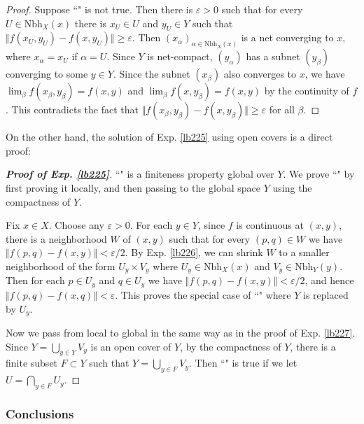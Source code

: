 \documentclass[12pt,b5paper,notitlepage]{article}
\theoremstyle{definition}
\theoremstyle{plain}
\newcommand{\Nbh}{\mathrm{Nbh}}
\newcommand{\eps}{\varepsilon}
\numberwithin{equation}{section}
\begin{document}
\begin{proof}
Suppose ``\textleaf" is not true. Then there is $\eps>0$ such that for every $U\in\Nbh_X(x)$ there is $x_U\in U$ and $y_U\in Y$ such that $\Vert f(x_U,y_U)-f(x,y_U)\Vert\geq\eps$. Then $(x_\alpha)_{\alpha\in\Nbh_X(x)}$ is a net converging to $x$, where $x_\alpha=x_U$ if $\alpha=U$. Since $Y$ is net-compact, $(y_\alpha)$ has a subnet $(y_\beta)$ converging to  some $y\in Y$. Since the subnet $(x_\beta)$ also converges to $x$, we have $\lim_\beta f(x_\beta,y_\beta)=f(x,y)$ and $\lim_\beta f(x,y_\beta)=f(x,y)$ by the continuity of $f$. This contradicts the fact that $\Vert f(x_\beta,y_\beta)-f(x,y_\beta)\Vert\geq\eps$ for all $\beta$.
\end{proof}



On the other hand, the solution of Exp. \ref{lb225} using open covers is a direct proof:

\begin{proof}[\textbf{Proof of Exp. \ref{lb225}}]
``\textleaf" is a finiteness property global over $Y$. We prove ``\textleaf" by first proving it locally, and then passing to the global space $Y$ using the compactness of $Y$.

Fix $x\in X$. Choose any $\eps>0$. For each $y\in Y$, since $f$ is continuous at $(x,y)$, there is a neighborhood $W$ of $(x,y)$ such that for every $(p,q)\in W$ we have $\Vert f(p,q)-f(x,y)\Vert<\eps/2$. By Exp. \ref{lb226}, we can shrink $W$ to a smaller neighborhood of the form $U_y\times V_y$ where $U_y\in\Nbh_X(x)$ and $V_y\in\Nbh_Y(y)$. Then for each $p\in U_y$ and $q\in U_y$ we have $\Vert f(p,q)-f(x,y)\Vert<\eps/2$, and hence $\Vert f(p,q)-f(x,q)\Vert<\eps$. This proves the special case of ``\textleaf" where $Y$ is replaced by $U_y$.

Now we pass from local to global in the same way as in the proof of Exp. \ref{lb227}. Since $Y=\bigcup_{y\in Y}V_y$ is an open cover of $Y$, by the compactness of $Y$, there is a finite subset $F\subset Y$ such that $Y=\bigcup_{y\in F}V_y$. Then ``\textleaf" is true if we let $U=\bigcap_{y\in F}U_y$.
\end{proof}


\subsubsection{Conclusions}
\end{document}
